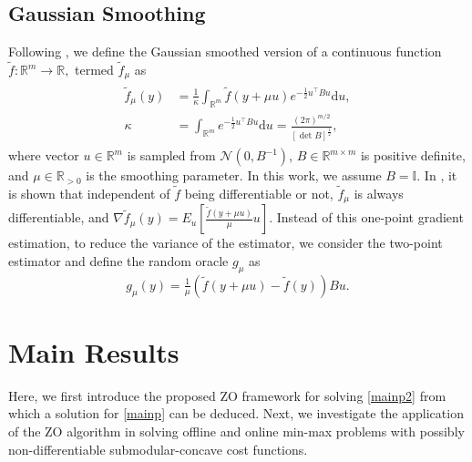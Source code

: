 \documentclass{article}
\theoremstyle{plain}
\theoremstyle{definition}
\theoremstyle{remark}
\newcommand{\R}{\mathbb{R}}
\begin{document}
\subsection{Gaussian Smoothing}
Following \cite{nesterov_random_2017}, we define the Gaussian smoothed version of a continuous function $\tilde{f}:\mathbb{R}^m\rightarrow\mathbb{R},$ termed $\tilde{f}_\mu$ as %
\begin{align}\label{eq:gsmooth}
	\begin{split}
		\tilde{f}_\mu(y) &= \frac{1}{\kappa}\int_{\R^m}\tilde{f}(y+\mu u)e^{-\frac{1}{2}u^\top B u}\mathrm{d}u,\\
        \kappa &=\int_{\R^m}e^{-\frac{1}{2}u^\top B u}\mathrm{d}u=\frac{(2\pi)^{m/2}}{[\det B]^{\frac{1}{2}}},
	\end{split}
\end{align}
where vector $u \in \R^m$ is sampled from $\mathcal{N}(0,B^{-1})$, $B\in \R^{m\times m}$ is positive definite, and $\mu \in \R_{>0}$ is the 
smoothing parameter. In this work, we assume $B=\mathbb{I}.$ In \cite{nesterov_random_2017}, it is shown that independent of 
$\tilde{f}$ being %
differentiable or not, $\tilde{f}_\mu$ is always differentiable, and
$\nabla \tilde{f}_\mu(y) = E_u[\frac{\tilde{f}(y+\mu u)}{\mu}u].$ 
Instead of this one-point gradient estimation, to reduce the variance of the estimator, we consider the two-point estimator and  define the random oracle $g_{\mu}$ as
\begin{equation}\label{eq:eq23}
	g_{\mu}(y) = \tfrac{1}{\mu}(\tilde{f}(y+\mu u)-\tilde{f}(y)) Bu. %
\end{equation}



\section{Main Results}\label{sec:main}
Here, we first introduce the proposed ZO framework for solving \eqref{mainp2} from which a solution for \eqref{mainp} can be deduced. Next, we investigate the application of the ZO algorithm in solving offline and online min-max problems with possibly non-differentiable submodular-concave cost functions.
\end{document}
